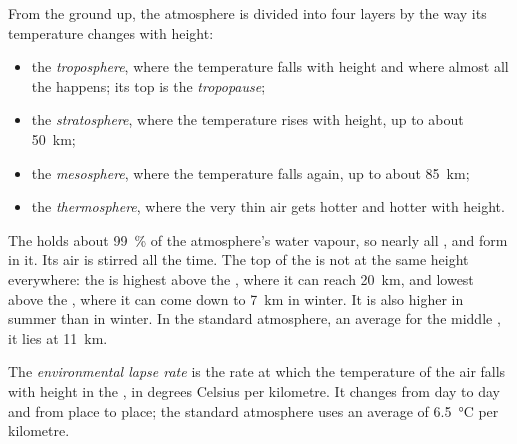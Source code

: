 \begin{definition}\label{def:g8:the-atmosphere:layers}
From the ground up, the atmosphere is divided into four layers by the
way its temperature changes with height:
\begin{itemize}
  \item the \emph{troposphere}, where the temperature
        falls with height and where almost all the  happens; its
        top is the \emph{tropopause};
  \item the \emph{stratosphere}, where the temperature
        rises with height, up to about \qty{50}{km};
  \item the \emph{mesosphere}, where the temperature
        falls again, up to about \qty{85}{km};
  \item the \emph{thermosphere}, where the very thin
        air gets hotter and hotter with height.
\end{itemize}
\end{definition}

The  holds about 99~\% of the atmosphere's water vapour, so
nearly all ,  and  form in it. Its air is stirred all the
time. The top of the  is not at the same height everywhere: the
 is highest above the , where it can reach \qty{20}{km},
and lowest above the , where it can come down to \qty{7}{km} in
winter. It is also higher in summer than in winter. In the standard
atmosphere, an average for the middle , it lies at \qty{11}{km}.

\begin{definition}\label{def:g8:the-atmosphere:lapse-rate}
The \emph{environmental lapse rate} is the
rate at which the temperature of the air falls with height in the
, in degrees Celsius per kilometre. It changes from day to day
and from place to place; the standard atmosphere uses an average of
\qty{6.5}{\degreeCelsius} per kilometre.
\end{definition}

